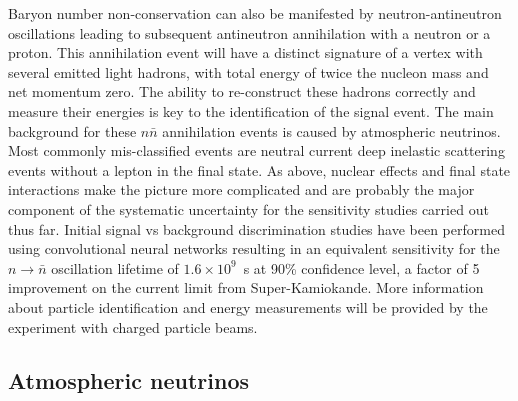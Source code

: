 



Baryon number non-conservation can also be manifested by neutron-antineutron oscillations leading to subsequent antineutron annihilation with a neutron or a proton. This annihilation event will have a distinct signature of a vertex with several emitted light hadrons, with total energy of twice the nucleon mass and net momentum zero. The ability to re-construct these hadrons correctly and measure their energies is key to the identification of the signal event. The main background for these $n\bar n$ annihilation events is caused by atmospheric neutrinos. Most commonly mis-classified events are neutral current deep inelastic scattering events without a lepton in the final state. As above, nuclear effects and final state interactions make the picture more complicated and are probably the major component of the systematic uncertainty for the sensitivity studies carried out thus far.  Initial signal vs background discrimination studies have been performed using convolutional neural networks resulting in an equivalent sensitivity for the $n\rightarrow \bar n$ oscillation lifetime of $1.6 \times 10^9$~s at 90\% confidence level, a factor of 5 improvement on the current limit from Super-Kamiokande.
More information about particle identification and energy measurements will be provided by the  experiment with charged particle beams. 


\subsection{Atmospheric neutrinos}

